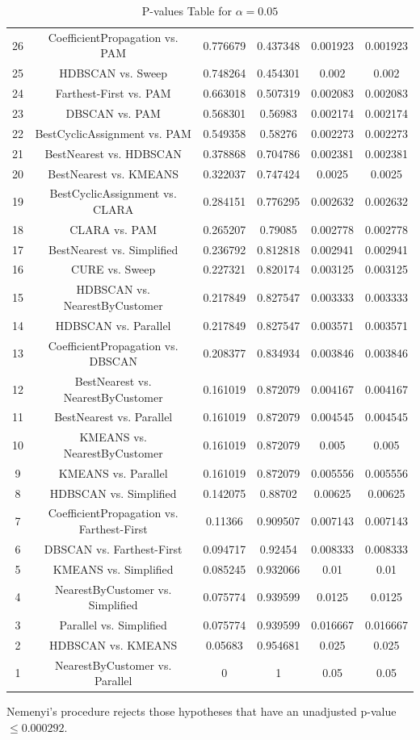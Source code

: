 \documentclass[a4paper,10pt]{article}
\begin{document}
\begin{landscape}
\begin{table}[!htp]
\begin{tabular}{cccccc}
26&CoefficientPropagation vs. PAM&0.776679&0.437348&0.001923&0.001923\\
25&HDBSCAN vs. Sweep&0.748264&0.454301&0.002&0.002\\
24&Farthest-First vs. PAM&0.663018&0.507319&0.002083&0.002083\\
23&DBSCAN vs. PAM&0.568301&0.56983&0.002174&0.002174\\
22&BestCyclicAssignment vs. PAM&0.549358&0.58276&0.002273&0.002273\\
21&BestNearest vs. HDBSCAN&0.378868&0.704786&0.002381&0.002381\\
20&BestNearest vs. KMEANS&0.322037&0.747424&0.0025&0.0025\\
19&BestCyclicAssignment vs. CLARA&0.284151&0.776295&0.002632&0.002632\\
18&CLARA vs. PAM&0.265207&0.79085&0.002778&0.002778\\
17&BestNearest vs. Simplified&0.236792&0.812818&0.002941&0.002941\\
16&CURE vs. Sweep&0.227321&0.820174&0.003125&0.003125\\
15&HDBSCAN vs. NearestByCustomer&0.217849&0.827547&0.003333&0.003333\\
14&HDBSCAN vs. Parallel&0.217849&0.827547&0.003571&0.003571\\
13&CoefficientPropagation vs. DBSCAN&0.208377&0.834934&0.003846&0.003846\\
12&BestNearest vs. NearestByCustomer&0.161019&0.872079&0.004167&0.004167\\
11&BestNearest vs. Parallel&0.161019&0.872079&0.004545&0.004545\\
10&KMEANS vs. NearestByCustomer&0.161019&0.872079&0.005&0.005\\
9&KMEANS vs. Parallel&0.161019&0.872079&0.005556&0.005556\\
8&HDBSCAN vs. Simplified&0.142075&0.88702&0.00625&0.00625\\
7&CoefficientPropagation vs. Farthest-First&0.11366&0.909507&0.007143&0.007143\\
6&DBSCAN vs. Farthest-First&0.094717&0.92454&0.008333&0.008333\\
5&KMEANS vs. Simplified&0.085245&0.932066&0.01&0.01\\
4&NearestByCustomer vs. Simplified&0.075774&0.939599&0.0125&0.0125\\
3&Parallel vs. Simplified&0.075774&0.939599&0.016667&0.016667\\
2&HDBSCAN vs. KMEANS&0.05683&0.954681&0.025&0.025\\
1&NearestByCustomer vs. Parallel&0&1&0.05&0.05\\
\hline
\end{tabular}
\caption{P-values Table for $\alpha=0.05$}
\end{table}Nemenyi's procedure rejects those hypotheses that have an unadjusted p-value $\le0.000292$.


\end{landscape}
\end{document}
